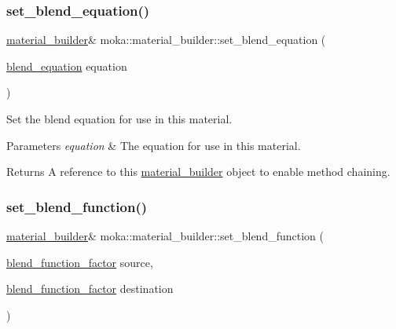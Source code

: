 \subsubsection{\texorpdfstring{set\_blend\_equation()}{set\_blend\_equation()}}
{\footnotesize\ttfamily \mbox{\hyperlink{classmoka_1_1material__builder}{material\+\_\+builder}}\& moka\+::material\+\_\+builder\+::set\+\_\+blend\+\_\+equation (\begin{DoxyParamCaption}\item[{\mbox{\hyperlink{namespacemoka_acf03408f89c521244763fb5f8746ce16}{blend\+\_\+equation}}}]{equation }\end{DoxyParamCaption})}



Set the blend equation for use in this material. 


\begin{DoxyParams}{Parameters}
{\em equation} & The equation for use in this material. \\
\hline
\end{DoxyParams}
\begin{DoxyReturn}{Returns}
A reference to this \mbox{\hyperlink{classmoka_1_1material__builder}{material\+\_\+builder}} object to enable method chaining. 
\end{DoxyReturn}
\mbox{\label{classmoka_1_1material__builder_aa7a7856e574c217b4f602358ac70813b}} 
\subsubsection{\texorpdfstring{set\_blend\_function()}{set\_blend\_function()}}
{\footnotesize\ttfamily \mbox{\hyperlink{classmoka_1_1material__builder}{material\+\_\+builder}}\& moka\+::material\+\_\+builder\+::set\+\_\+blend\+\_\+function (\begin{DoxyParamCaption}\item[{\mbox{\hyperlink{namespacemoka_a631c77633ed9ed0c34a6632a8211a19d}{blend\+\_\+function\+\_\+factor}}}]{source,  }\item[{\mbox{\hyperlink{namespacemoka_a631c77633ed9ed0c34a6632a8211a19d}{blend\+\_\+function\+\_\+factor}}}]{destination }\end{DoxyParamCaption})}



